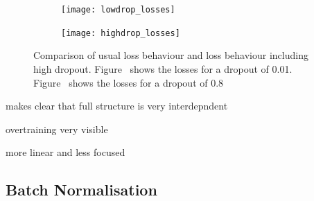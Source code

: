 \begin{figure}[htbp]
    \centering
    \begin{subfigure}[b]{0.45\textwidth}
        \texttt{[image: lowdrop\_losses]}
        \caption{}
        \label{fig:dropout:low}
    \end{subfigure}
\quad
    \begin{subfigure}[b]{0.45\textwidth}
        \texttt{[image: highdrop\_losses]}
        \caption{}
        \label{fig:dropout:high}
    \end{subfigure}
    \caption{Comparison of usual loss behaviour and loss behaviour including high dropout. Figure~ shows the losses for a dropout of \num{0.01}. Figure~ shows the losses for a dropout of \num{0.8}}
	\label{fig:dropout}
\end{figure}

makes clear that full structure is very interdepndent

overtraining very visible

more linear and less focused

\subsection{Batch Normalisation}